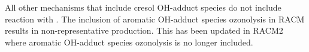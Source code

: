All other mechanisms that include cresol OH-adduct species do not include reaction with . 
The inclusion of aromatic OH-adduct species ozonolysis in RACM results in non-representative  production. 
This has been updated in RACM2 where aromatic OH-adduct species ozonolysis is no longer included.
